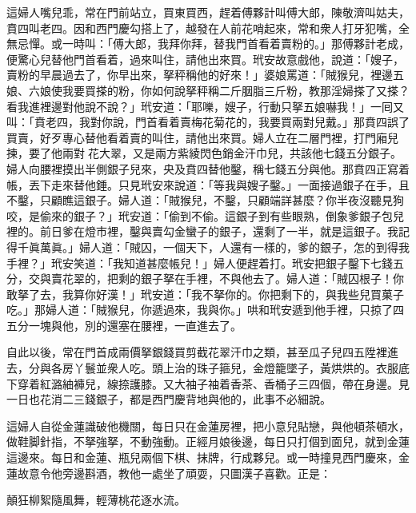這婦人嘴兒乖，常在門前站立，買東買西，趕着傅夥計叫傅大郎，陳敬濟叫姑夫，賁四叫老四。因和西門慶勾搭上了，越發在人前花哨起來，常和衆人打牙犯嘴，全無忌憚。或一時叫：「傅大郎，我拜你拜，替我門首看着賣粉的。」{}那傅夥計老成，便驚心兒替他門首看着，過來叫住，請他出來買。玳安故意戲他，說道：「嫂子，賣粉的早晨過去了，你早出來，拏秤稱他的好來！」婆娘罵道：「賊猴兒，裡邊五娘、六娘使我要買搽的粉，你如何說拏秤稱二斤胭脂三斤粉，教那淫婦搽了又搽？看我進裡邊對他說不說？」玳安道：「耶嚛，嫂子，行動只拏五娘嚇我！」一囘又叫：「賁老四，我對你說，門首看着賣梅花菊花的，我要買兩對兒戴。」{}那賁四誤了買賣，好歹專心替他看着賣的叫住，請他出來買。婦人立在二層門裡，打門廂兒揀，要了他兩對𩬆花大翠，又是兩方紫綾閃色銷金汗巾兒，共該他七錢五分銀子。婦人向腰裡摸出半側銀子兒來，央及賁四替他鑿，稱七錢五分與他。那賁四正寫着帳，丟下走來替他錘。只見玳安來說道：「等我與嫂子鑿。」一面接過銀子在手，且不鑿，只顧瞧這銀子。{}婦人道：「賊猴兒，不鑿，只顧端詳甚麼？你半夜沒聽見狗咬，是偷來的銀子？」玳安道：「偷到不偷。這銀子到有些眼熟，倒象爹銀子包兒裡的。前日爹在燈市裡，鑿與賣勾金蠻子的銀子，還剩了一半，就是這銀子。我記得千眞萬眞。」婦人道：「賊囚，一個天下，人還有一樣的，爹的銀子，怎的到得我手裡？」{}玳安笑道：「我知道甚麼帳兒！」婦人便趕着打。玳安把銀子鑿下七錢五分，交與賣花翠的，把剩的銀子拏在手裡，不與他去了。婦人道：「賊囚根子！你敢拏了去，我算你好漢！」玳安道：「我不拏你的。你把剩下的，與我些兒買菓子吃。」那婦人道：「賊猴兒，你遞過來，我與你。」哄和玳安遞到他手裡，只掠了四五分一塊與他，別的還塞在腰裡，一直進去了。

自此以後，常在門首成兩價拏銀錢買剪截花翠汗巾之類，甚至瓜子兒四五陞裡進去，分與各房丫鬟並衆人吃。頭上治的珠子箍兒，金燈籠墜子，黃烘烘的。衣服底下穿着紅潞紬褲兒，線捺護膝。又大袖子袖着香茶、香桶子三四個，帶在身邊。見一日也花消二三錢銀子，都是西門慶背地與他的，此事不必細說。

這婦人自從金蓮識破他機關，每日只在金蓮房裡，把小意兒貼戀，與他頓茶頓水，做鞋脚針指，不拏強拏，不動強動。正經月娘後邊，每日只打個到面兒，就到金蓮這邊來。每日和金蓮、瓶兒兩個下棋、抹牌，行成夥兒。或一時撞見西門慶來，金蓮故意令他旁邊斟酒，教他一處坐了頑耍，只圖漢子喜歡。正是：

\begin{myquote} 
顛狂柳絮隨風舞，輕薄桃花逐水流。
\end{myquote} 

